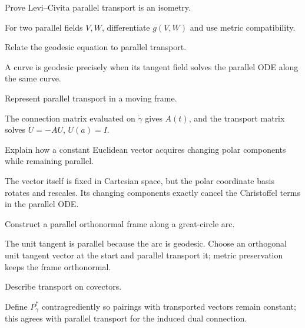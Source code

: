 \begin{problem}\label{prob:vii24-05}
Prove Levi--Civita parallel transport is an isometry.
\end{problem}
\begin{solution}
For two parallel fields \(V,W\), differentiate \(g(V,W)\) and use metric compatibility.
\end{solution}


\begin{problem}\label{prob:vii24-06}
Relate the geodesic equation to parallel transport.
\end{problem}
\begin{solution}
A curve is geodesic precisely when its tangent field solves the parallel ODE along the same curve.
\end{solution}


\begin{problem}\label{prob:vii24-07}
Represent parallel transport in a moving frame.
\end{problem}
\begin{solution}
The connection matrix evaluated on \(\dot\gamma\) gives \(A(t)\), and the transport matrix solves \(\dot U=-AU\), \(U(a)=I\).
\end{solution}


\begin{problem}\label{prob:vii24-08}
Explain how a constant Euclidean vector acquires changing polar components while remaining parallel.
\end{problem}
\begin{solution}
The vector itself is fixed in Cartesian space, but the polar coordinate basis rotates and rescales. Its changing components exactly cancel the Christoffel terms in the parallel ODE.
\end{solution}


\begin{problem}\label{prob:vii24-09}
Construct a parallel orthonormal frame along a great-circle arc.
\end{problem}
\begin{solution}
The unit tangent is parallel because the arc is geodesic. Choose an orthogonal unit tangent vector at the start and parallel transport it; metric preservation keeps the frame orthonormal.
\end{solution}


\begin{problem}\label{prob:vii24-10}
Describe transport on covectors.
\end{problem}
\begin{solution}
Define \(P_\gamma^*\) contragrediently so pairings with transported vectors remain constant; this agrees with parallel transport for the induced dual connection.
\end{solution}


